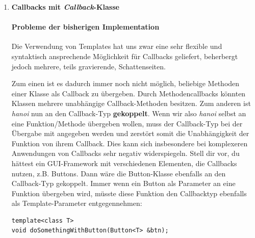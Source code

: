 \begin{enumerate}
Dadurch kann an \emph{hanoi()} fast alles übergeben werden, was sich syntaktisch mittels
\begin{lstlisting}
	callback(a, c);
\end{lstlisting}
aufrufen lässt, also auch Objekte, bei denen der $()$ Operator überladen ist (sog. \emph{Functors}\footnote{\url{https://de.wikipedia.org/wiki/Funktionsobjekt}}).
Dabei müssen nicht einmal die Parametertypen (\emph{int}) exakt übereinstimmen, solange eine implizite Umwandlung durch den Compiler möglich ist.

Teste deine Implementation mit einem Functor.
Schreibe dafür eine einfache Klasse und überlade deren \emph{operator()}:
\begin{lstlisting}
	void operator()(int from, int to);
\end{lstlisting}

\item \textbf{Callbacks mit \emph{Callback}-Klasse}

\paragraph*{Probleme der bisherigen Implementation}
Die Verwendung von Templates hat uns zwar eine sehr flexible und syntaktisch ansprechende Möglichkeit für Callbacks geliefert, beherbergt jedoch mehrere, teils gravierende, Schattenseiten.

Zum einen ist es dadurch immer noch nicht möglich, beliebige Methoden einer Klasse als Callback zu übergeben.
Durch Methodencallbacks könnten Klassen mehrere unabhängige Callback-Methoden besitzen.
Zum anderen ist \emph{hanoi} nun an den Callback-Typ \textbf{gekoppelt}. Wenn wir also \emph{hanoi} selbst an eine Funktion/Methode übergeben wollen, muss der Callback-Typ bei der Übergabe mit angegeben werden und zerstört somit die Unabhängigkeit der Funktion von ihrem Callback.
Dies kann sich insbesondere bei komplexeren Anwendungen von Callbacks sehr negativ widerspiegeln.
Stell dir vor, du hättest ein GUI-Framework mit verschiedenen Elementen, die Callbacks nutzen, z.B. Buttons.
Dann wäre die Button-Klasse ebenfalls an den Callback-Typ gekoppelt.
Immer wenn ein Button als Parameter an eine Funktion übergeben wird, müsste diese Funktion den Callbacktyp ebenfalls als Template-Parameter entgegennehmen:

\begin{lstlisting}
template<class T>
void doSomethingWithButton(Button<T> &btn);
\end{lstlisting}


\end{enumerate}
